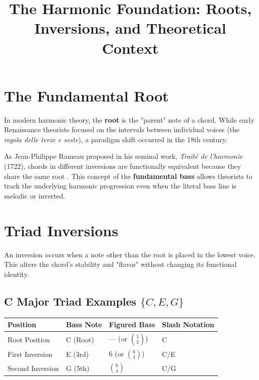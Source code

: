 \documentclass[11pt,a4paper]{article}
\title{The Harmonic Foundation: Roots, Inversions, and Theoretical Context}
\author{}
\date{}
\begin{document}
\maketitle

\section{The Fundamental Root}
In modern harmonic theory, the \textbf{root} is the "parent" note of a chord. While early Renaissance theorists focused on the intervals between individual voices (the \textit{regola delle terze e seste}), a paradigm shift occurred in the 18th century.

As Jean-Philippe Rameau proposed in his seminal work, \textit{Traité de l'harmonie} (1722), chords in different inversions are functionally equivalent because they share the same root \citep{rameau1722}. This concept of the \textbf{fundamental bass} allows theorists to track the underlying harmonic progression even when the literal bass line is melodic or inverted.

\section{Triad Inversions}
An inversion occurs when a note other than the root is placed in the lowest voice. This alters the chord's stability and "flavor" without changing its functional identity.

\subsection{C Major Triad Examples $\{C, E, G\}$}
\begin{table}[h]
\centering
\begin{tabular}{@{}llll@{}}
\toprule
\textbf{Position} & \textbf{Bass Note} & \textbf{Figured Bass} & \textbf{Slash Notation} \\ \midrule
Root Position     & C (Root)           & --- (or $\binom{5}{3}$) & C                       \\
First Inversion   & E (3rd)            & $6$ (or $\binom{6}{3}$) & C/E                     \\
Second Inversion  & G (5th)            & $\binom{6}{4}$          & C/G                     \\ \bottomrule
\end{tabular}
\end{table}
\end{document}
